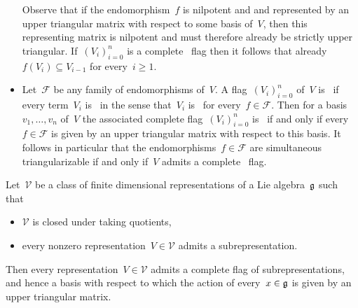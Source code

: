 \begin{recall}
\begin{itemize}
      Observe that if the endomorphism~$f$ is nilpotent and and represented by an upper triangular matrix with respect to some basis of~$V$, then this representing matrix is nilpotent and must therefore already be strictly upper triangular.
      If~$(V_i)_{i=0}^n$ is a complete~{} flag then it follows that already~$f(V_i) \subseteq V_{i-1}$ for every~$i \geq 1$.
    \item
      Let~$\mathcal{F}$ be any family of endomorphisms of~$V$.
      A flag~$(V_i)_{i=0}^n$ of~$V$ is~ if every term~$V_i$ is~{} in the sense that~$V_i$ is~{} for every~$f \in \mathcal{F}$.
      Then for a basis~$v_1, \dotsc, v_n$ of~$V$ the associated complete flag~$(V_i)_{i=0}^n$ is~{} if and only if every~$f \in \mathcal{F}$ is given by an upper triangular matrix with respect to this basis.
      It follows in particular that the endomorphisms~$f \in \mathcal{F}$ are simultaneous triangularizable if and only if~$V$ admits a complete~{} flag.
  \end{itemize}
\end{recall}


\begin{lemma}
  \label{triangularization lemma}
  Let~$\mathcal{V}$ be a class of finite dimensional representations of a Lie algebra~$\mathfrak{g}$ such that
  \begin{itemize}
    \item
      $\mathcal{V}$ is closed under taking quotients,
    \item
      every nonzero representation~$V \in \mathcal{V}$ admits a {\onedimensional} subrepresentation.
  \end{itemize}
  Then every representation~$V \in \mathcal{V}$ admits a complete flag of subrepresentations, and hence a basis with respect to which the action of every~$x \in \mathfrak{g}$ is given by an upper triangular matrix.
\end{lemma}


